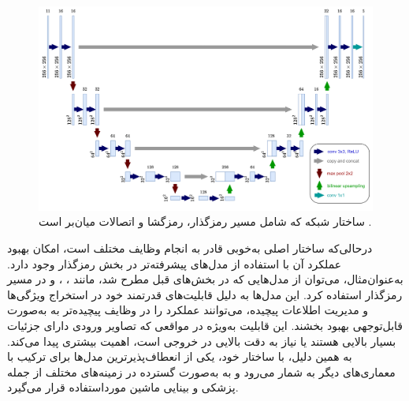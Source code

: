 \begin{figure}[h]
    \centering
    \includegraphics[width=1\textwidth]{Images/Chapter2/U-Net.drawio.png}
    \caption{ساختار شبکه
      که شامل مسیر رمزگذار، رمزگشا و اتصالات میان‌بر است
    \cite{ronneberger2015u}.}
    \label{fig:unet_architecture}
\end{figure}

درحالی‌که ساختار اصلی  به‌خوبی قادر به انجام وظایف مختلف است، امکان بهبود عملکرد آن با استفاده از مدل‌های پیشرفته‌تر در بخش رمزگذار وجود دارد. به‌عنوان‌مثال، می‌توان از مدل‌هایی که در بخش‌های قبل مطرح شد،‌ مانند
 ، ،  و 
  در مسیر رمزگذار
   استفاده کرد. این مدل‌ها به دلیل قابلیت‌های قدرتمند خود در استخراج ویژگی‌ها و مدیریت اطلاعات پیچیده، می‌توانند عملکرد
    را در وظایف پیچیده‌تر به به‌صورت قابل‌توجهی بهبود بخشند. 
این قابلیت به‌ویژه در مواقعی که تصاویر ورودی دارای جزئیات بسیار بالایی هستند یا نیاز به دقت بالایی در خروجی است، اهمیت بیشتری پیدا می‌کند. به همین دلیل،  با ساختار خود، یکی از انعطاف‌پذیرترین مدل‌ها برای ترکیب با معماری‌های دیگر به شمار می‌رود و به ‌به‌صورت گسترده در زمینه‌های مختلف از جمله پزشکی و بینایی ماشین مورداستفاده قرار می‌گیرد.





